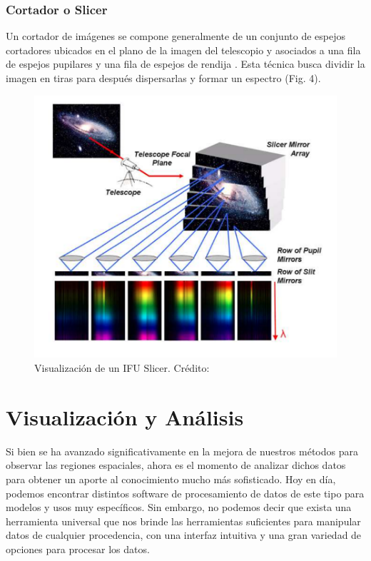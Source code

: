 \documentclass[10pt,twocolumn,a4paper]{opticajnl}
\begin{document}
\subsubsection*{Cortador o Slicer}
Un cortador de imágenes se compone generalmente de un conjunto de espejos cortadores ubicados en el plano de la imagen del telescopio y asociados a una fila de espejos pupilares y una fila de espejos de rendija \cite{vives2005original}. Esta técnica busca dividir la imagen en tiras para después dispersarlas y formar un espectro (Fig. 4).
\begin{figure}
    \centering
    \includegraphics[width=1\linewidth]{slicerimg1.png}
    \caption{Visualización de un IFU Slicer. Crédito: \cite{vives2005original}}
    \label{fig:slicerimg1}
\end{figure}


\section*{Visualización y Análisis}
Si bien se ha avanzado significativamente en la mejora de nuestros métodos para observar las regiones espaciales, ahora es el momento de analizar dichos datos para obtener un aporte al conocimiento mucho más sofisticado. Hoy en día, podemos encontrar distintos software de procesamiento de datos de este tipo para modelos y usos muy específicos. Sin embargo, no podemos decir que exista una herramienta universal que nos brinde las herramientas suficientes para manipular datos de cualquier procedencia, con una interfaz intuitiva y una gran variedad de opciones para procesar los datos.
\end{document}
